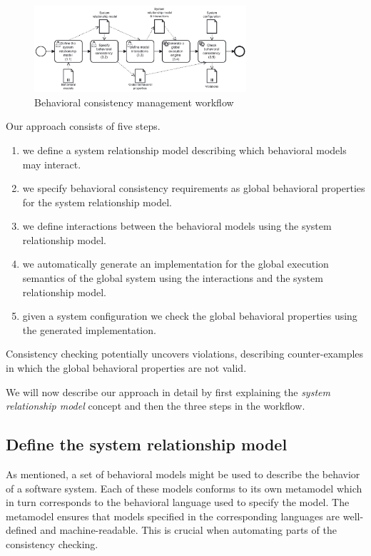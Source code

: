 \documentclass{jot}
\begin{document}
\begin{figure}[h]
    \centering
    \includegraphics[width=0.7\textwidth]{figures/workflow.pdf}
    \caption{Behavioral consistency management workflow}
    \label{fig:approach}
\end{figure}

Our approach consists of five steps.
\begin{enumerate}
    \item we define a system relationship model describing which behavioral models may interact.
    \item we specify behavioral consistency requirements as global behavioral properties for the system relationship model.
    \item we define interactions between the behavioral models using the system relationship model.
    \item we automatically generate an implementation for the global execution semantics of the global system
    using the interactions and the system relationship model.
    \item given a system configuration we check the global behavioral properties using the generated implementation.
\end{enumerate}
Consistency checking potentially uncovers violations, describing counter-examples in which the global behavioral properties are not valid.

We will now describe our approach in detail by first explaining the \textit{system relationship model} concept and then the three steps in the workflow.





\subsection{Define the system relationship model}\label{sec:system-rel-model}

As mentioned, a set of behavioral models might be used to describe the behavior of a software system.
Each of these models conforms to its own metamodel which in turn corresponds to the behavioral language used to specify the model.
The metamodel ensures that models specified in the corresponding languages are well-defined and machine-readable.
This is crucial when automating parts of the consistency checking.
\end{document}
